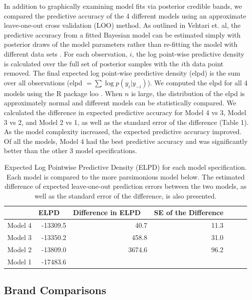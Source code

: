 \documentclass[12pt]{article}
\begin{document}
In addition to graphically examining model fits via posterior credible bands, we compared the predictive accuracy of the 4 different models using an approximate leave-one-out cross validation (LOO) method.  As outlined in Vehtari et. al, the predictive accuracy from a fitted Bayesian model can be estimated simply with posterior draws of the model parameters rather than re-fitting the model with different data sets \cite{vehtari}.  For each observation, $i$, the log point-wise predictive density is calculated over the full set of posterior samples with the $i$th data point removed.  The final expected log point-wise predictive density (elpd) is the sum over all observations (elpd $=\sum{\log p(y_i|y_{-i})}$).  We computed the elpd for all 4 models using the R package loo \cite{loo}.  When $n$ is large, the distribution of the elpd is approximately normal and different models can be statistically compared.  We calculated the difference in expected predictive accuracy for Model 4 vs 3, Model 3 vs 2, and Model 2 vs 1, as well as the standard error of the difference (Table 1).  As the model complexity increased, the expected predictive accuracy improved.  Of all the models, Model 4 had the best predictive accuracy and was significantly better than the other 3 model specifications.

\begin{table}[H]
\centering
\begin{tabular}{rrrrrrr}
  \hline
 & ELPD \ & Difference in ELPD \ & SE of the Difference \\ 
  \hline
Model 4 & -13309.5 & 40.7 & 11.3 \\ 
Model 3 & -13350.2 & 458.8 & 31.0  \\ 
Model 2 & -13809.0 & 3674.6 & 96.2 \\ 
Model 1 & -17483.6  \\ 
   \hline
\end{tabular}
\caption{Expected Log Pointwise Predictive Density (ELPD) for each model specification.  Each model is compared to the more parsimonious model below.  The estimated difference of expected leave-one-out prediction errors between the two models, as well as the standard error of the difference, is also presented.}
\label{table:1}
\end{table}


\subsection{Brand Comparisons}
\end{document}

